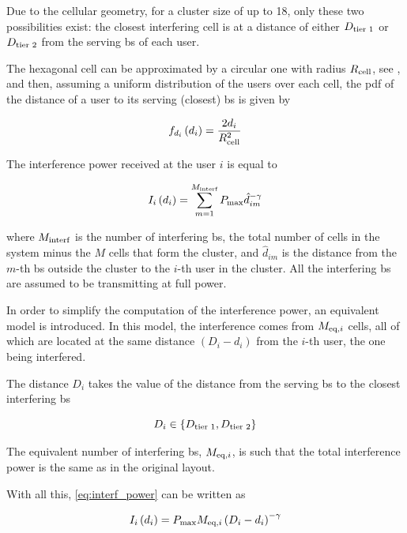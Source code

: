 Due to the cellular geometry, for a cluster size of up to 18, only these two
possibilities exist: the closest interfering cell is at a distance of either
$D_{\text{tier 1}}$ or $D_{\text{tier 2}}$ from the serving \gls{bs} of each user.

The hexagonal cell can be approximated by a circular one with radius $R_{\text{cell}}$,
see , and then, assuming a uniform distribution
of the users over each cell, the \gls{pdf} of the distance of a user to its
serving (closest) \gls{bs} is given by

\begin{equation} \label{eq:pdf_distance}
    f_{d_i}\left(d_i\right) = \frac{2d_i}{R_{\text{cell}}^2}
\end{equation}

The interference power received at the user $i$ is equal to

\begin{equation} \label{eq:interf_power}
    I_i\left( d_i \right) = \sum\limits_{m=1}^{M_{\text{interf}}}P_{\max}
    \hat{d}_{im}^{-\gamma}
\end{equation}

\noindent
where $M_{\text{interf}}$ is the number of interfering \gls{bs}, \ie the total
number of cells in the system minus the $M$ cells that form the cluster, and
$\hat{d}_{im}$ is the distance from the $m$-th \gls{bs} outside the cluster to
the $i$-th user in the cluster. All the interfering \gls{bs} are assumed to be
transmitting at full power.

In order to simplify the computation of the interference power, an equivalent
model is introduced. In this model, the interference comes from $M_{\text{eq},i}$ cells,
all of which are located at the same distance $\left(D_i - d_i\right)$ from the
$i$-th user, the one being interfered. 

The distance $D_i$ takes the value of the distance from the serving \gls{bs} to
the closest interfering \gls{bs}

\begin{equation} \label{eq:interf_min_dist}
    D_i \in \left\{ D_{\text{tier 1}}, D_{\text{tier 2}} \right\}
\end{equation}

The equivalent number of interfering \gls{bs}, $M_{\text{eq},i}$, is such that the total
interference power is the same as in the original layout.

With all this, \eqref{eq:interf_power} can be written as

\begin{equation} \label{eq:interf_power_eq}
    I_i\left(d_i\right) = P_{\max}M_{\text{eq},i}\left(D_i - d_i\right)^{-\gamma}
\end{equation}

